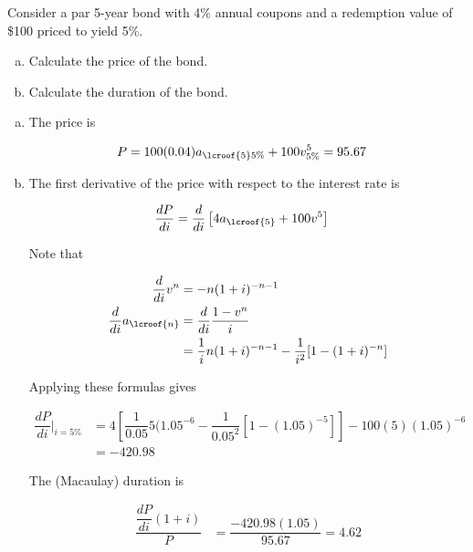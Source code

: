\documentclass{article}
\numberwithin{questioncounter}{section}
\begin{document}
\begin{question}
Consider a par 5-year bond with 4\% annual coupons and a redemption value of \$100 priced to yield 5\%.

\begin{enumerate}[(a)]
\item Calculate the price of the bond.
\item Calculate the duration of the bond.
\end{enumerate}

\end{question}

\begin{solution}
\begin{enumerate}[(a)]
\item The price is

\begin{align*}
P &= 100(0.04) a_{\lcroof{5} 5\%} + 100 v^{5}_{5\%} = 95.67
\end{align*}

\item The first derivative of the price with respect to the interest rate is

\begin{align*}
\dfrac{dP}{di} &= \dfrac{d}{di} \left[ 4 a_{\lcroof{5}} + 100v^{5} \right]
\end{align*}

Note that

\begin{align*}
\dfrac{d}{di} v^{n} &= - n(1+i)^{-n-1} \\
\dfrac{d}{di} a_{\lcroof{n}} &= \dfrac{d}{di} \dfrac{1 - v^{n}}{i} \\
&= \dfrac{1}{i} n(1+i)^{-n-1} - \dfrac{1}{i^2} [1 - (1+i)^{-n}]
\end{align*}

Applying these formulas gives

\begin{align*}
\dfrac{dP}{di} \Big|_{i = 5\%} &= 4 \left[\dfrac{1}{0.05} 5(1.05^{-6} - \dfrac{1}{0.05^2}[1 - (1.05)^{-5}]\right] - 100(5)(1.05)^{-6} \\
&= -420.98
\end{align*}

The (Macaulay) duration is

\begin{align*}
\dfrac{\dfrac{dP}{di} (1 + i)}{P} &= \dfrac{-420.98 (1.05)}{95.67} = 4.62
\end{align*}

\end{enumerate}
\end{solution}
\end{document}

